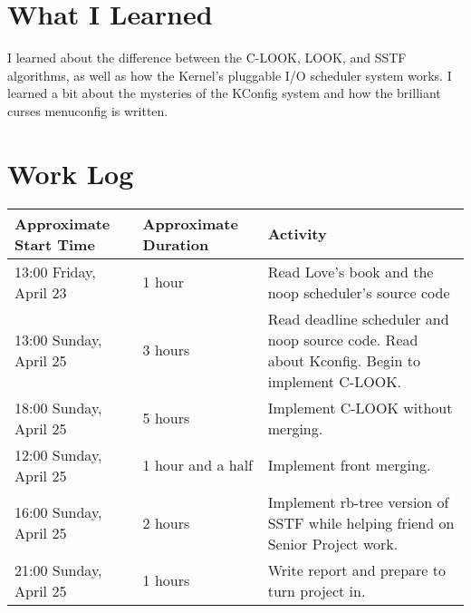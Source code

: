 \documentclass[10pt,conference,draftclsnofoot,onecolumn]{IEEEtran}
\begin{document}
\section{What I Learned}
I learned about the difference between the C-LOOK, LOOK, and SSTF algorithms, as well as how the Kernel's pluggable I/O scheduler system works. I learned a bit about the mysteries of the KConfig system and how the brilliant curses menuconfig is written.


\section{Work Log}
\begin{tabular}{|p{5cm}|p{5cm}|p{5cm}}
    \textbf{Approximate Start Time} & \textbf{Approximate Duration} & \textbf{Activity} \\
    \hline
    13:00 Friday, April 23 & 1 hour & Read Love's book and the noop scheduler's source code \\
    13:00 Sunday, April 25 & 3 hours & Read deadline scheduler and noop source code. Read about Kconfig. Begin to implement C-LOOK.\\
    18:00 Sunday, April 25 & 5 hours & Implement C-LOOK without merging.\\
    12:00 Sunday, April 25 & 1 hour and a half & Implement front merging.\\
    16:00 Sunday, April 25 & 2 hours & Implement rb-tree version of SSTF while helping friend on Senior Project work.\\
    21:00 Sunday, April 25 & 1 hours & Write report and prepare to turn project in.\\
\end{tabular}

\bigskip
\bigskip
\end{document}
